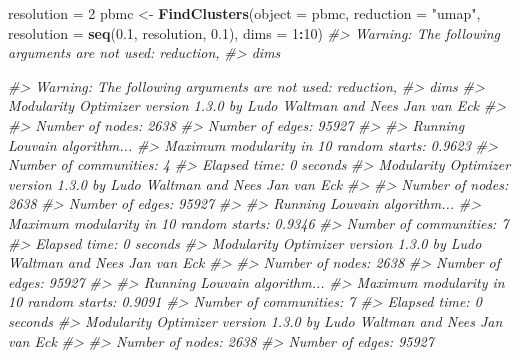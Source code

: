 \documentclass[
]{book}
\newenvironment{Shaded}{\begin{snugshade}}{\end{snugshade}}
\newcommand{\AttributeTok}[1]{\textcolor[rgb]{0.13,0.29,0.53}{#1}}
\newcommand{\CommentTok}[1]{\textcolor[rgb]{0.56,0.35,0.01}{\textit{#1}}}
\newcommand{\DecValTok}[1]{\textcolor[rgb]{0.00,0.00,0.81}{#1}}
\newcommand{\FloatTok}[1]{\textcolor[rgb]{0.00,0.00,0.81}{#1}}
\newcommand{\FunctionTok}[1]{\textcolor[rgb]{0.13,0.29,0.53}{\textbf{#1}}}
\newcommand{\NormalTok}[1]{#1}
\newcommand{\OtherTok}[1]{\textcolor[rgb]{0.56,0.35,0.01}{#1}}
\newcommand{\SpecialCharTok}[1]{\textcolor[rgb]{0.81,0.36,0.00}{\textbf{#1}}}
\newcommand{\StringTok}[1]{\textcolor[rgb]{0.31,0.60,0.02}{#1}}
\begin{document}
\begin{Shaded}
\begin{Highlighting}[]
\NormalTok{resolution }\OtherTok{=} \DecValTok{2}
\NormalTok{pbmc }\OtherTok{\textless{}{-}} \FunctionTok{FindClusters}\NormalTok{(}\AttributeTok{object =}\NormalTok{ pbmc, }\AttributeTok{reduction =} \StringTok{"umap"}\NormalTok{, }\AttributeTok{resolution =} \FunctionTok{seq}\NormalTok{(}\FloatTok{0.1}\NormalTok{, resolution, }\FloatTok{0.1}\NormalTok{),}
    \AttributeTok{dims =} \DecValTok{1}\SpecialCharTok{:}\DecValTok{10}\NormalTok{)}
\CommentTok{\#\textgreater{} Warning: The following arguments are not used: reduction,}
\CommentTok{\#\textgreater{} dims}

\CommentTok{\#\textgreater{} Warning: The following arguments are not used: reduction,}
\CommentTok{\#\textgreater{} dims}
\CommentTok{\#\textgreater{} Modularity Optimizer version 1.3.0 by Ludo Waltman and Nees Jan van Eck}
\CommentTok{\#\textgreater{} }
\CommentTok{\#\textgreater{} Number of nodes: 2638}
\CommentTok{\#\textgreater{} Number of edges: 95927}
\CommentTok{\#\textgreater{} }
\CommentTok{\#\textgreater{} Running Louvain algorithm...}
\CommentTok{\#\textgreater{} Maximum modularity in 10 random starts: 0.9623}
\CommentTok{\#\textgreater{} Number of communities: 4}
\CommentTok{\#\textgreater{} Elapsed time: 0 seconds}
\CommentTok{\#\textgreater{} Modularity Optimizer version 1.3.0 by Ludo Waltman and Nees Jan van Eck}
\CommentTok{\#\textgreater{} }
\CommentTok{\#\textgreater{} Number of nodes: 2638}
\CommentTok{\#\textgreater{} Number of edges: 95927}
\CommentTok{\#\textgreater{} }
\CommentTok{\#\textgreater{} Running Louvain algorithm...}
\CommentTok{\#\textgreater{} Maximum modularity in 10 random starts: 0.9346}
\CommentTok{\#\textgreater{} Number of communities: 7}
\CommentTok{\#\textgreater{} Elapsed time: 0 seconds}
\CommentTok{\#\textgreater{} Modularity Optimizer version 1.3.0 by Ludo Waltman and Nees Jan van Eck}
\CommentTok{\#\textgreater{} }
\CommentTok{\#\textgreater{} Number of nodes: 2638}
\CommentTok{\#\textgreater{} Number of edges: 95927}
\CommentTok{\#\textgreater{} }
\CommentTok{\#\textgreater{} Running Louvain algorithm...}
\CommentTok{\#\textgreater{} Maximum modularity in 10 random starts: 0.9091}
\CommentTok{\#\textgreater{} Number of communities: 7}
\CommentTok{\#\textgreater{} Elapsed time: 0 seconds}
\CommentTok{\#\textgreater{} Modularity Optimizer version 1.3.0 by Ludo Waltman and Nees Jan van Eck}
\CommentTok{\#\textgreater{} }
\CommentTok{\#\textgreater{} Number of nodes: 2638}
\CommentTok{\#\textgreater{} Number of edges: 95927}

\end{Highlighting}
\end{Shaded}
\end{document}
